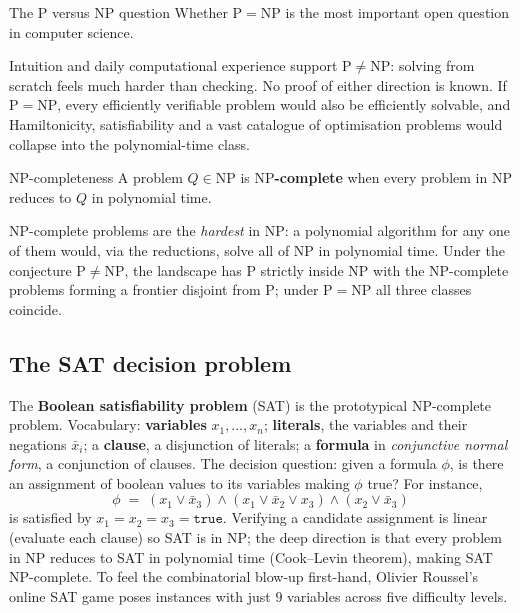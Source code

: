 \begin{notebox}{The $\mathrm{P}$ versus $\mathrm{NP}$ question}
Whether $\mathrm{P} = \mathrm{NP}$ is the most important open question in computer science.
\end{notebox}
Intuition and daily computational experience support $\mathrm{P} \neq \mathrm{NP}$: solving from scratch feels much harder than checking. No proof of either direction is known. If $\mathrm{P} = \mathrm{NP}$, every efficiently verifiable problem would also be efficiently solvable, and Hamiltonicity, satisfiability and a vast catalogue of optimisation problems would collapse into the polynomial-time class.
\begin{definitionbox}{$\mathrm{NP}$-completeness}
A problem $Q \in \mathrm{NP}$ is \textbf{$\mathrm{NP}$-complete} when every problem in $\mathrm{NP}$ reduces to $Q$ in polynomial time.
\end{definitionbox}
$\mathrm{NP}$-complete problems are the \emph{hardest} in $\mathrm{NP}$: a polynomial algorithm for any one of them would, via the reductions, solve all of $\mathrm{NP}$ in polynomial time. Under the conjecture $\mathrm{P} \neq \mathrm{NP}$, the landscape has $\mathrm{P}$ strictly inside $\mathrm{NP}$ with the $\mathrm{NP}$-complete problems forming a frontier disjoint from $\mathrm{P}$; under $\mathrm{P} = \mathrm{NP}$ all three classes coincide.

\subsection{The SAT decision problem}

The \textbf{Boolean satisfiability problem} (SAT) is the prototypical $\mathrm{NP}$-complete problem. Vocabulary: \textbf{variables} $x_1, \dots, x_n$; \textbf{literals}, the variables and their negations $\bar{x}_i$; a \textbf{clause}, a disjunction of literals; a \textbf{formula} in \emph{conjunctive normal form}, a conjunction of clauses. The decision question: given a formula $\phi$, is there an assignment of boolean values to its variables making $\phi$ true? For instance,
\[
  \phi \;=\; (x_1 \lor \bar{x}_3) \land (x_1 \lor \bar{x}_2 \lor x_3) \land (x_2 \lor \bar{x}_3)
\]
is satisfied by $x_1 = x_2 = x_3 = \texttt{true}$. Verifying a candidate assignment is linear (evaluate each clause) so SAT is in $\mathrm{NP}$; the deep direction is that every problem in $\mathrm{NP}$ reduces to SAT in polynomial time (Cook--Levin theorem), making SAT $\mathrm{NP}$-complete. To feel the combinatorial blow-up first-hand, Olivier Roussel's online SAT game poses instances with just $9$ variables across five difficulty levels.
